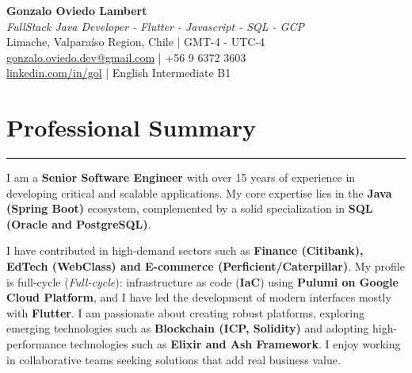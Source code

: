 \documentclass[11pt,a4paper]{article}
\begin{document}
\begin{center}
    {\LARGE \textbf{Gonzalo Oviedo Lambert}} \\
    \vspace{2pt}
    \textit{FullStack Java Developer - Flutter - Javascript - SQL - GCP} \\
    \vspace{2pt}
    Limache, Valparaíso Region, Chile | GMT-4 - UTC-4 \\
    \vspace{2pt}
    \href{gonzalo.oviedo.dev@gmail.com}{gonzalo.oviedo.dev@gmail.com} | +56 9 6372 3603 \\
    \href{https://www.linkedin.com/in/gol}{linkedin.com/in/gol} | English Intermediate B1
\end{center}

\section*{Professional Summary}
\hrule
\vspace{5pt}
\noindent
I am a \textbf{Senior Software Engineer} with over 15 years of experience in developing critical and scalable applications. My core expertise lies in the \textbf{Java (Spring Boot)} ecosystem, complemented by a solid specialization in \textbf{SQL (Oracle and PostgreSQL)}.

\par\vspace{8pt}

\noindent
I have contributed in high-demand sectors such as \textbf{Finance (Citibank), EdTech (WebClass) and E-commerce (Perficient/Caterpillar)}. My profile is full-cycle (\textit{Full-cycle}): infrastructure as code (\textbf{IaC}) using \textbf{Pulumi on Google Cloud Platform}, and I have led the development of modern interfaces mostly with \textbf{Flutter}. I am passionate about creating robust platforms, exploring emerging technologies such as \textbf{Blockchain (ICP, Solidity)} and adopting high-performance technologies such as \textbf{Elixir and Ash Framework}. I enjoy working in collaborative teams seeking solutions that add real business value.
\end{document}
